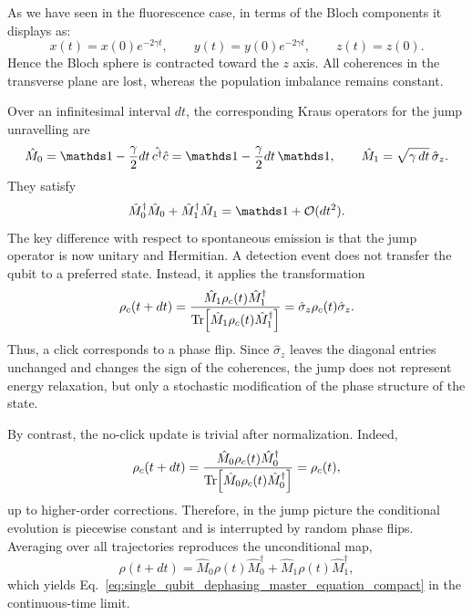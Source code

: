 As we have seen in the fluorescence case, in terms of the Bloch components it displays as:
\begin{equation}
	x(t)=x(0)e^{-2\gamma t},
	\qquad
	y(t)=y(0)e^{-2\gamma t},
	\qquad
	z(t)=z(0).
	\label{eq:single_qubit_dephasing_bloch_xy}
\end{equation}
Hence the Bloch sphere is contracted toward the \(z\) axis. All coherences in the transverse plane are lost, whereas the population imbalance remains constant.

Over an infinitesimal interval \(dt\), the corresponding Kraus operators for the jump unravelling are
\begin{equation}
	\hat M_0
	=
	\id-\frac{\gamma}{2}dt\,\hat{c^\dagger}\hat{c}
	=
	\id-\frac{\gamma}{2}dt\,\id,
	\qquad
	\hat M_1
	=
	\sqrt{\gamma\,dt}\,\hat \sigma_z.
	\label{eq:single_qubit_dephasing_kraus}
\end{equation}
They satisfy
\begin{equation}
	\hat M_0^\dagger \hat M_0 + \hat M_1^\dagger \hat M_1
	=
	\id+\mathcal{O}(dt^2).
	\label{eq:single_qubit_dephasing_kraus_normalization}
\end{equation}
The key difference with respect to spontaneous emission is that the jump operator is now unitary and Hermitian. A detection event does not transfer the qubit to a preferred state. Instead, it applies the transformation
\begin{equation}
	\rho_c(t+dt)
	=
	\frac{\hat M_1 \rho_c(t)\hat M_1^\dagger}
	{\Tr\!\left[\hat M_1 \rho_c(t)\hat M_1^\dagger\right]}
	=
	\hat \sigma_z \rho_c(t)\hat \sigma_z.
	\label{eq:single_qubit_dephasing_click_state}
\end{equation}
Thus, a click corresponds to a phase flip. Since \(\hat \sigma_z\) leaves the diagonal entries unchanged and changes the sign of the coherences, the jump does not represent energy relaxation, but only a stochastic modification of the phase structure of the state.

By contrast, the no-click update is trivial after normalization. Indeed,
\begin{equation}
	\rho_c(t+dt)
	=
	\frac{\hat M_0 \rho_c(t)\hat M_0^\dagger}
	{\Tr\!\left[\hat M_0 \rho_c(t)\hat M_0^\dagger\right]}
	=
	\rho_c(t),
	\label{eq:single_qubit_dephasing_no_click_state}
\end{equation}
up to higher-order corrections. Therefore, in the jump picture the conditional evolution is piecewise constant and is interrupted by random phase flips. Averaging over all trajectories reproduces the unconditional map,
\begin{equation}
	\rho(t+dt)
	=
	\hat M_0 \rho(t)\hat M_0^\dagger
	+
	\hat M_1 \rho(t)\hat M_1^\dagger,
	\label{eq:single_qubit_dephasing_unconditional_map}
\end{equation}
which yields Eq.~\eqref{eq:single_qubit_dephasing_master_equation_compact} in the continuous-time limit.

